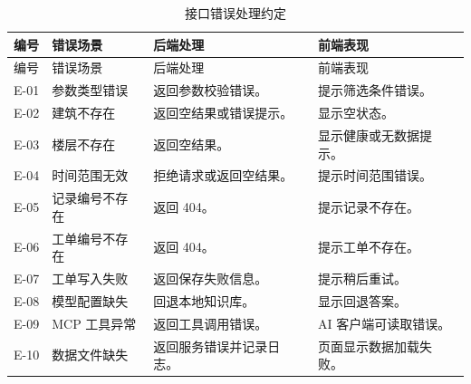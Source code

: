 \documentclass[12pt,a4paper]{ctexart}
\begin{document}
\begin{longtable}{L{2.0cm}L{4.2cm}L{5.0cm}L{3.4cm}}
\caption{接口错误处理约定}\\
\toprule
编号 & 错误场景 & 后端处理 & 前端表现 \\
\midrule
\endfirsthead
\toprule
编号 & 错误场景 & 后端处理 & 前端表现 \\
\midrule
\endhead
E-01 & 参数类型错误 & 返回参数校验错误。 & 提示筛选条件错误。 \\
E-02 & 建筑不存在 & 返回空结果或错误提示。 & 显示空状态。 \\
E-03 & 楼层不存在 & 返回空结果。 & 显示健康或无数据提示。 \\
E-04 & 时间范围无效 & 拒绝请求或返回空结果。 & 提示时间范围错误。 \\
E-05 & 记录编号不存在 & 返回 404。 & 提示记录不存在。 \\
E-06 & 工单编号不存在 & 返回 404。 & 提示工单不存在。 \\
E-07 & 工单写入失败 & 返回保存失败信息。 & 提示稍后重试。 \\
E-08 & 模型配置缺失 & 回退本地知识库。 & 显示回退答案。 \\
E-09 & MCP 工具异常 & 返回工具调用错误。 & AI 客户端可读取错误。 \\
E-10 & 数据文件缺失 & 返回服务错误并记录日志。 & 页面显示数据加载失败。 \\
\bottomrule
\end{longtable}
\end{document}
